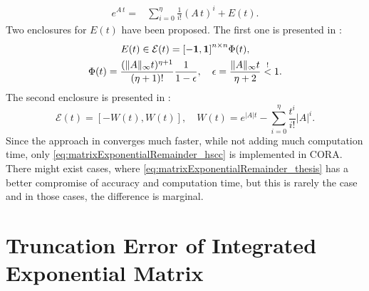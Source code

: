 \documentclass{amsproc}
\renewcommand{\^}[1]{^{(#1)}}
\begin{document}
\begin{equation}\label{eq:taylorSeries}
\begin{split}
	e^{A \, t} =& \sum_{i=0}^{\eta} \frac{1}{i!}(A \, t)^i + E(t).
\end{split}
\end{equation}
Two enclosures for $E(t)$ have been proposed. The first one is presented in \cite[eq.~(3.3)]{Althoff2010a}:
\begin{gather}\label{eq:matrixExponentialRemainder_thesis}
 E(t) \in \mathcal{E}(t)  = \mathbf{[-1,1]}^{n \times n} \Phi(t), \\
 \Phi(t) = \frac{(\|A\|_{\infty}t)^{\eta+1}}{(\eta+1)!}\frac{1}{1-\epsilon}, \quad \epsilon=\frac{\|A\|_{\infty}t}{\eta+2}\overset{!}{<}1. \notag
\end{gather}
The second enclosure is presented in \cite[Prop.~2]{Althoff2011a}:
\begin{equation}\label{eq:matrixExponentialRemainder_hscc}
 \mathcal{E}(t)= [-W(t),W(t)], \quad W(t)=e^{|A|t} - \sum_{i=0}^{\eta} \frac{t^i}{i!}|A|^i.
\end{equation}
Since the approach in \cite[Prop.~2]{Althoff2011a} converges much faster, while not adding much computation time, only \eqref{eq:matrixExponentialRemainder_hscc} is implemented in CORA. There might exist cases, where \eqref{eq:matrixExponentialRemainder_thesis} has a better compromise of accuracy and computation time, but this is rarely the case and in those cases, the difference is marginal.

\section{Truncation Error of Integrated Exponential Matrix}
\end{document}
